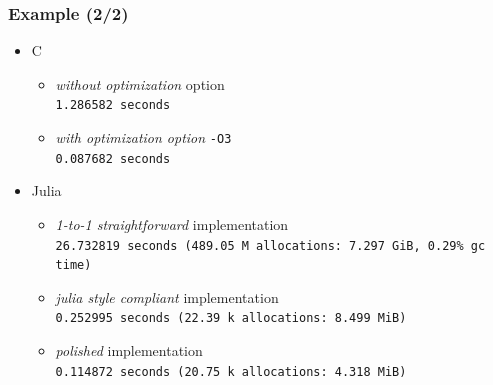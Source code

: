 \documentclass[]{beamer}
\newcommand*{\blue}[1]{\textcolor{nblue}{#1}}
\begin{document}
% 
%
\begin{frame}
  \frametitle{Example (2/2)}
\vspace{3mm}

\begin{itemize}
\item \blue{C}\\
\vspace{2mm}

\begin{itemize}
\item[] \hspace{-7.75mm}\textit{without optimization} option\\
{\scriptsize
\hspace{-7.5mm}\texttt{1.286582 seconds} %
}
\vspace{2mm}

\item[] \hspace{-8.2mm} \textit{with optimization option } \texttt{-O3}\\
{\scriptsize
\hspace{-7.5mm}\texttt{0.087682 seconds} %
}
\end{itemize}

\vspace{5mm}

\item \blue{Julia}\\
\vspace{2mm}

\begin{itemize}
\item[] \hspace{-7.75mm}\textit{1-to-1 straightforward} implementation\\
{\scriptsize
\hspace{-7.5mm}\texttt{26.732819 seconds (489.05 M allocations: 7.297 GiB, 0.29\% gc time)} %
}
\vspace{-2mm}%

\item[] \hspace{-7.95mm} \textit{julia style compliant} implementation\\
{\scriptsize
\hspace{-7.5mm}\texttt{0.252995 seconds (22.39 k allocations: 8.499 MiB)} %
}
\vspace{2mm}%

\item[] \hspace{-7.85mm} \textit{polished} implementation \\
{\scriptsize
\hspace{-7.5mm}\texttt{0.114872 seconds (20.75 k allocations: 4.318 MiB)} %
}
\end{itemize}
\end{itemize}

\end{frame}
\end{document}
